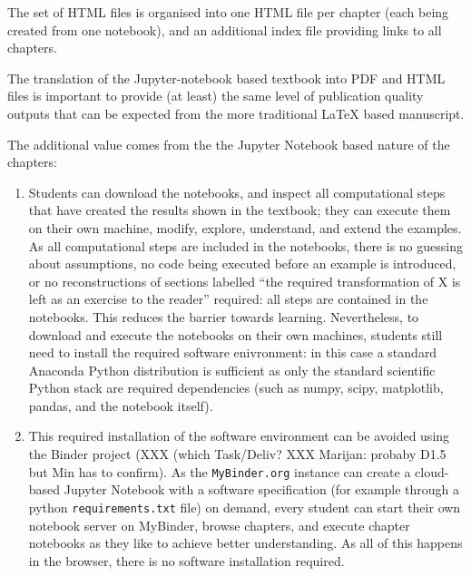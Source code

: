 \documentclass{deliverablereport}
\begin{document}
The set of HTML files is organised into one HTML file per chapter
(each being created from one notebook), and an additional index file
providing links to all chapters.

The translation of the Jupyter-notebook based textbook into PDF and
HTML files is important to provide (at least) the same level of
publication quality outputs that can be expected from the more
traditional LaTeX based manuscript.

The additional value comes from the the Jupyter Notebook based
nature of the chapters:

\begin{enumerate}
\item Students can download the notebooks, and inspect all
  computational steps that have created the results shown in the
  textbook; they can execute them on their own machine, modify,
  explore, understand, and extend the examples. As all computational
  steps are included in the notebooks, there is no guessing about
  assumptions, no code being executed before an example is introduced,
  or no reconstructions of sections labelled ``the required
  transformation of X is left as an exercise to the reader'' required:
  all steps are contained in the notebooks. This reduces the barrier
  towards learning. Nevertheless, to download and execute the
  notebooks on their own machines, students still need to install the
  required software enivronment: in this case a standard Anaconda
  Python distribution is sufficient as only the standard scientific
  Python stack are required dependencies (such as numpy, scipy,
  matplotlib, pandas, and the notebook itself).

\item This required installation of the software environment can be
  avoided using the Binder project (XXX (which Task/Deliv? XXX
  Marijan: probaby D1.5 but Min has to confirm). As the
  \texttt{MyBinder.org} instance can create a cloud-based Jupyter
  Notebook with a software specification (for example through a python
  \texttt{requirements.txt} file) on demand, every student can start
  their own notebook server on MyBinder, browse chapters, and execute
  chapter notebooks as they like to achieve better understanding. As
  all of this happens in the browser, there is no software
  installation required.
\end{enumerate}

\end{document}
